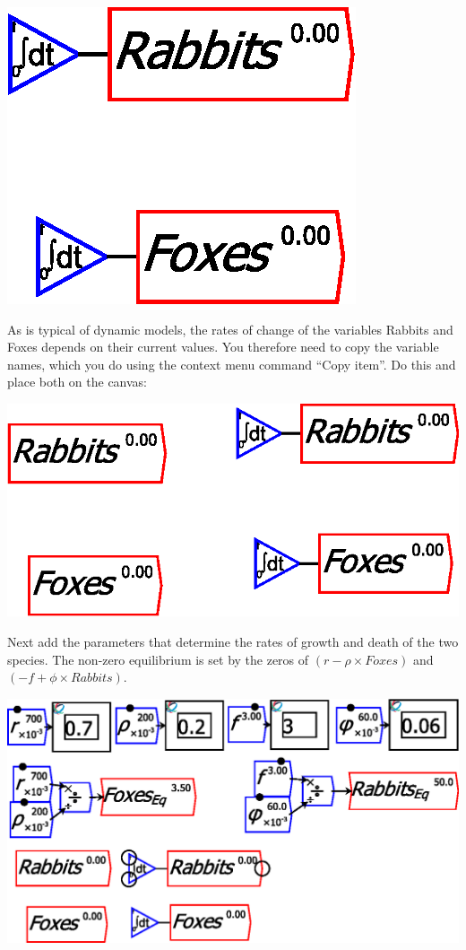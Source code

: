 \includegraphics{images/PredatorPreyRabbitsFoxesIntegralsOnly}

As is typical of dynamic models, the rates of change of the variables
Rabbits and Foxes depends on their current values. You therefore need
to copy the variable names, which you do using the context menu command
``Copy item''. Do this and place both on the canvas:

\includegraphics{images/PredatorPreyRabbitsFoxes02}

Next add the parameters that determine the rates of growth and death
of the two species. The non-zero equilibrium is set by the zeros of
$\left(r-\rho\times Foxes\right)$ and $\left(-f+\phi\times Rabbits\right)$.

\includegraphics{images/PredatorPreyRabbitsFoxes03ParametersAdded}

